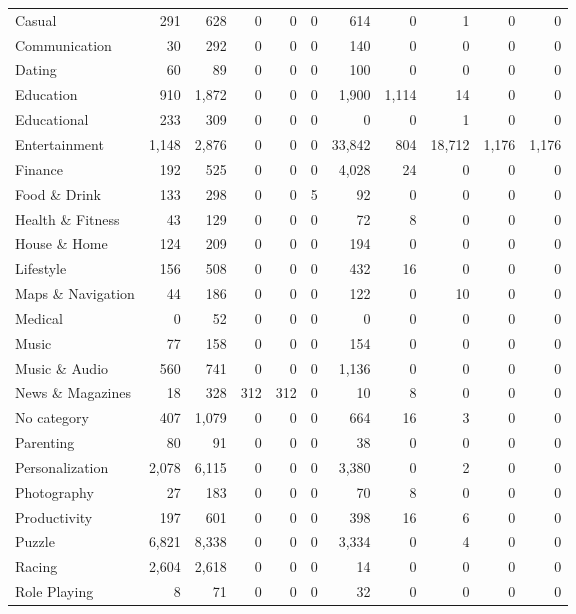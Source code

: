 \begin{table}[p]
\begin{tabular}{lrrrrrrrrrr}
        Casual & 291 & 628 & 0 & 0 & 0 & 614 & 0 & 1 & 0 & 0 \\
        Communication & 30 & 292 & 0 & 0 & 0 & 140 & 0 & 0 & 0 & 0 \\
        Dating & 60 & 89 & 0 & 0 & 0 & 100 & 0 & 0 & 0 & 0 \\
        Education & 910 & 1,872 & 0 & 0 & 0 & 1,900 & 1,114 & 14 & 0 & 0 \\
        Educational & 233 & 309 & 0 & 0 & 0 & 0 & 0 & 1 & 0 & 0 \\
        Entertainment & 1,148 & 2,876 & 0 & 0 & 0 & 33,842 & 804 & 18,712 & 1,176 & 1,176 \\
        Finance & 192 & 525 & 0 & 0 & 0 & 4,028 & 24 & 0 & 0 & 0 \\
        Food \& Drink & 133 & 298 & 0 & 0 & 5 & 92 & 0 & 0 & 0 & 0 \\
        Health \& Fitness & 43 & 129 & 0 & 0 & 0 & 72 & 8 & 0 & 0 & 0 \\
        House \& Home & 124 & 209 & 0 & 0 & 0 & 194 & 0 & 0 & 0 & 0 \\
        Lifestyle & 156 & 508 & 0 & 0 & 0 & 432 & 16 & 0 & 0 & 0 \\
        Maps \& Navigation & 44 & 186 & 0 & 0 & 0 & 122 & 0 & 10 & 0 & 0 \\
        Medical & 0 & 52 & 0 & 0 & 0 & 0 & 0 & 0 & 0 & 0 \\
        Music & 77 & 158 & 0 & 0 & 0 & 154 & 0 & 0 & 0 & 0 \\
        Music \& Audio & 560 & 741 & 0 & 0 & 0 & 1,136 & 0 & 0 & 0 & 0 \\
        News \& Magazines & 18 & 328 & 312 & 312 & 0 & 10 & 8 & 0 & 0 & 0 \\
        No category & 407 & 1,079 & 0 & 0 & 0 & 664 & 16 & 3 & 0 & 0 \\
        Parenting & 80 & 91 & 0 & 0 & 0 & 38 & 0 & 0 & 0 & 0 \\
        Personalization & 2,078 & 6,115 & 0 & 0 & 0 & 3,380 & 0 & 2 & 0 & 0 \\
        Photography & 27 & 183 & 0 & 0 & 0 & 70 & 8 & 0 & 0 & 0 \\
        Productivity & 197 & 601 & 0 & 0 & 0 & 398 & 16 & 6 & 0 & 0 \\
        Puzzle & 6,821 & 8,338 & 0 & 0 & 0 & 3,334 & 0 & 4 & 0 & 0 \\
        Racing & 2,604 & 2,618 & 0 & 0 & 0 & 14 & 0 & 0 & 0 & 0 \\
        Role Playing & 8 & 71 & 0 & 0 & 0 & 32 & 0 & 0 & 0 & 0 \\

\end{tabular}
\end{table}
